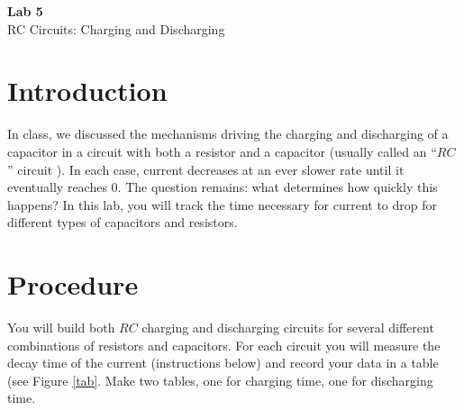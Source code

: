 \documentclass{article}
\begin{document}
\fancyfoot[C]{\thepage}
\vspace*{0cm}
\begin{center}
	{\LARGE \textbf{Lab 5}}\\
	\vspace{.5cm}
	{\Large RC Circuits: Charging and Discharging}
\end{center}

\section*{Introduction}
In class, we discussed the mechanisms driving the charging and discharging of a capacitor in a circuit with both a resistor and a capacitor (usually called an ``$RC$'' circuit ). In each case, current decreases at an ever slower rate until it eventually reaches 0. The question remains: what determines how quickly this happens? In this lab, you will track the time necessary for current to drop for different types of capacitors and resistors.

\section*{Procedure}
You will build both $RC$ charging and discharging circuits for several different combinations of resistors and capacitors. For each circuit you will measure the decay time of the current (instructions below) and record your data in a table (see Figure \ref{tab}. Make two tables, one for charging time, one for discharging time.
\end{document}
